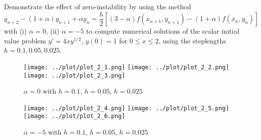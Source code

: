 \begin{problem}[L 2.5.4]
  Demonstrate the effect of zero-instability by using the method
  \[
    y_{n + 2} - (1 + \alpha)y_{n + 1} + \alpha y_n = \frac{h}{2}\left[(3-\alpha) f(x_{n+1}, y_{n+1}) - (1 + \alpha) f(x_n, y_n)\right]
  \]
  with (i) $\alpha = 0$, (ii) $\alpha = -5$ to compute numerical solutions of the scalar initial value problem $y' = 4xy^{1/2}$, $y(0) = 1$ for $0 \leq x \leq 2$, using the steplengths $h = 0.1, 0.05, 0.025$.
\end{problem}

\begin{solution}
  \begin{figure}[!ht]
    \centering
    \texttt{[image: ../plot/plot\_2\_1.png]}
    \texttt{[image: ../plot/plot\_2\_2.png]}
    \texttt{[image: ../plot/plot\_2\_3.png]}
    \caption{$\alpha = 0$ with $h = 0.1$, $h = 0.05$, $h = 0.025$}
    \label{fig:prob2_1}
  \end{figure}
  \begin{figure}[!ht]
    \centering
    \texttt{[image: ../plot/plot\_2\_4.png]}
    \texttt{[image: ../plot/plot\_2\_5.png]}
    \texttt{[image: ../plot/plot\_2\_6.png]}
    \caption{$\alpha = -5$ with $h = 0.1$, $h = 0.05$, $h = 0.025$}
    \label{fig:prob2_2}
  \end{figure}
\end{solution}
